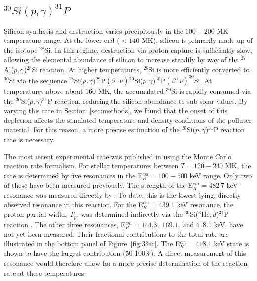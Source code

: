 \documentclass[twocolumn]{aastex6}
\newcommand{\nuclei}[2]{$^{#1}${#2}}
\newcommand{\pgreaction}[4]{\nuclei{#1}{#2}($p,\gamma$)\nuclei{#3}{#4}}
\newcommand{\hedreaction}[4]{\nuclei{#1}{#2}($^3$He$,d$)\nuclei{#3}{#4}}
\begin{document}
\subsection{$^{30}Si(p,\gamma)^{31}P$}
Silicon synthesis and destruction varies precipitously in the $100-200$ MK temperature range. At the lower-end ($< 140$ MK), silicon is primarily made up of the isotope \nuclei{28}{Si}. In this regime, destruction via proton capture is sufficiently slow, allowing the elemental abundance of silicon to increase steadily by way of the \pgreaction{27}{Al}{28}{Si} reaction. At higher temperatures, \nuclei{28}{Si} is more efficiently converted to \nuclei{30}{Si} via the sequence \pgreaction{28}{Si}{29}{P}$(\beta^+\nu)$\pgreaction{29}{Si}{30}{P}$(\beta^+\nu)^{30}$Si.
At temperatures above about $160$ MK, the accumulated \nuclei{30}{Si} is rapidly consumed via the \pgreaction{30}{Si}{31}{P} reaction, reducing the silicon abundance to sub-solar values.
By varying this rate in Section~\ref{sec:methods}, we found that the onset of this depletion affects the simulated temperature and density conditions of the polluter material.
For this reason, a more precise estimation of the \pgreaction{30}{Si}{31}{P} reaction rate is necessary. 
\par
The most recent experimental rate was published in \citet{Longland_2010} using the Monte Carlo reaction rate formalism.
For stellar temperatures between $T=120-240$ MK, the rate is determined by five resonances in the E$^{cm}_R=100-500$ keV range. Only two of these have been measured previously.
The strength of the E$^{cm}_R=482.7$ keV resonance was measured directly by \citet{Kuperus_1959}. To date, this is the lowest-lying, directly observed resonance in this reaction. For the E$^{cm}_R=439.1$ keV resonance, the proton partial width, $\Gamma_p$, was determined indirectly via the \hedreaction{30}{Si}{31}{P} reaction \citep{Vernotte_1990}. The other three resonances, E$^{cm}_R=144.3,\; 169.1,\; \text{and}\; 418.1$ keV, have not yet been measured. 
Their fractional contributions to the total rate are illustrated in the bottom panel of Figure~\ref{fig:38ar}. 
The E$^{cm}_R=418.1$ keV state is shown to have the largest contribution (50-100\%). A direct measurement of this resonance would therefore allow for a more precise determination of the reaction rate at these temperatures.
%
%
\end{document}
